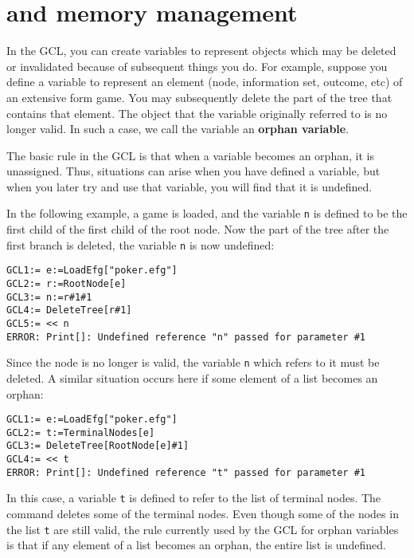 \section{ and memory management}

In the GCL, you
can create variables to represent objects which may be deleted or
invalidated because of subsequent things you do. For example, suppose
you define a variable to represent an element (node, information set,
outcome, etc) of an extensive form game.  You may subsequently delete
the part of the tree that contains that element.  The object that the
variable originally referred to is no longer valid.  In such a case,
we call the variable an {\bf orphan variable}.

The basic rule in the GCL is that when a variable becomes an orphan,
it is unassigned.  Thus, situations can arise when you have defined a
variable, but when you later try and use that variable, you will find
that it is undefined.  

In the following example, a game is loaded, and the variable \verb+n+
is defined to be the first child of the first child of the root node.
Now the part of the tree after the first branch is deleted, the
variable \verb+n+ is now undefined:

\begin{verbatim}
GCL1:= e:=LoadEfg["poker.efg"]
GCL2:= r:=RootNode[e]
GCL3:= n:=r#1#1
GCL4:= DeleteTree[r#1]
GCL5:= << n
ERROR: Print[]: Undefined reference "n" passed for parameter #1
\end{verbatim}

\noindent
Since the node is no longer is valid, the variable \verb+n+ which
refers to it must be deleted.  A similar situation occurs here if some
element of a list becomes an orphan:

\begin{verbatim}
GCL1:= e:=LoadEfg["poker.efg"]
GCL2:= t:=TerminalNodes[e]
GCL3:= DeleteTree[RootNode[e]#1]
GCL4:= << t
ERROR: Print[]: Undefined reference "t" passed for parameter #1
\end{verbatim}

In this case, a variable \verb+t+ is defined to refer to the list of
terminal nodes.  The  command deletes some of the
terminal nodes.  Even though some of the nodes in the list \verb+t+
are still valid, the rule currently used by the GCL for orphan
variables is that if any element of a list becomes an orphan, the
entire list is undefined.  

